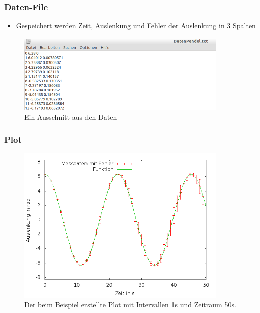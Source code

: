 \documentclass[11pt]{beamer}
\begin{document}
\begin{frame}
\frametitle{Daten-File}
\begin{itemize}
\item Gespeichert werden Zeit, Auslenkung und Fehler der Auslenkung in 3 Spalten
\end{itemize}
\begin{figure} [H]
\centering
\includegraphics[width=0.9\textwidth]{Daten.jpg}
\caption{Ein Ausschnitt aus den Daten}
\end{figure}
\end{frame}

\begin{frame}
\frametitle{Plot}
\begin{figure} [H]
\centering
\includegraphics[width=0.9\textwidth]{Plot.png}
\caption{Der beim Beispiel erstellte Plot mit Intervallen 1s und Zeitraum 50s.}
\end{figure}
\end{frame}
\end{document}
